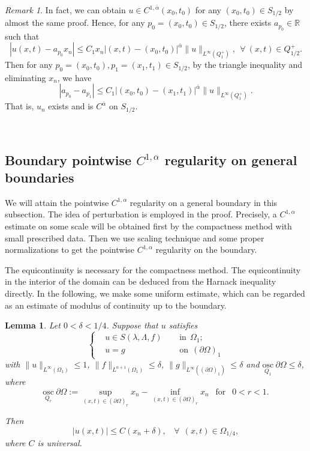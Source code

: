\documentclass[preprint,12pt]{elsarticle}
\newtheorem{lemma}[theorem]{Lemma}
\theoremstyle{definition}
\theoremstyle{remark}
\newtheorem{remark}[theorem]{Remark}
\numberwithin{equation}{section}
\begin{document}
\begin{remark}\label{re2.3}
In fact, we can obtain $u\in C^{1,\bar\alpha}(x_0,t_0)$ for any $(x_0,t_0)\in S_{1/2}$ by almost the same proof. Hence, for any $p_0=(x_0,t_0)\in S_{1/2}$, there exists $a_{p_0}\in \mathbb{R}$ such that
\begin{equation*}
|u(x,t)-a_{p_0}x_n|\leq C_1 x_n|(x,t)-(x_0,t_0)|^{\bar{\alpha}}\|u\|_{L^{\infty}(Q_1^+)},~~\forall~(x,t)\in Q^+_{1/2}.
\end{equation*}
Then for any $p_0=(x_0,t_0),p_1=(x_1,t_1)\in S_{1/2}$, by the triangle inequality and eliminating $x_n$, we have
\begin{equation*}
|a_{p_0}-a_{p_1}|\leq C_1|(x_0,t_0)-(x_1,t_1)|^{\bar{\alpha}}\|u\|_{L^{\infty}(Q_1^+)}.
\end{equation*}
That is, $u_n$ exists and is $C^{\bar{\alpha}}$ on $S_{1/2}$.
\end{remark}
~\\

\subsection{Boundary pointwise $C^{1,\alpha}$ regularity on general boundaries}

We will attain the pointwise $C^{1,\alpha}$ regularity on a general boundary in this subsection. The idea of perturbation is employed in the proof. Precisely, a $C^{1,\alpha}$ estimate on some scale will be obtained first by the compactness method with small prescribed data. Then we use scaling technique and some proper normalizations to get the pointwise $C^{1,\alpha}$ regularity on the boundary.

The equicontinuity is necessary for the compactness method. The equicontinuity in the interior of the domain can be deduced from the Harnack inequality directly. In the following, we make some uniform estimate, which can be regarded as an estimate of modulus of continuity up to the boundary.

\begin{lemma}\label{L21}
Let $0<\delta<1/4$. Suppose that $u$ satisfies
\begin{equation*}
\left\{\begin{aligned}
&u\in S(\lambda,\Lambda,f)&& ~~\mbox{in}~~\Omega_1;\\
&u=g&& ~~\mbox{on}~~(\partial \Omega)_1
\end{aligned}\right.
\end{equation*}
with $\|u\|_{L^{\infty}(\Omega_1)}\leq 1$, $\|f\|_{L^{n+1}(\Omega_1)}\leq\delta$, $\|g\|_{L^{\infty}((\partial \Omega)_1)}\leq \delta$
and $\underset{Q_1}{\mathrm{osc}}~\partial\Omega \leq \delta$, where
\begin{equation*}
\underset{Q_{r}}{\mathrm{osc}}~\partial\Omega:= \underset{(x,t)\in (\partial\Omega)_r}{\sup} x_n -\underset{(x,t)\in (\partial\Omega)_r}{\inf} x_n~~\mbox{ for }~~0<r<1.
\end{equation*}

Then
\begin{equation}\label{e1.6}
 |u(x,t)|\leq C(x_n+\delta),~~~~\forall ~~(x,t) \in \Omega_{1/4},
\end{equation}
where $C$ is universal.
\end{lemma}
\end{document}
